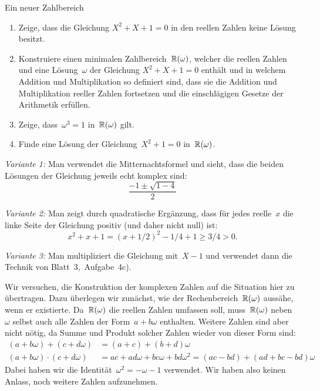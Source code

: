\documentclass{algblatt}
\begin{document}
\ifloesungen\newpage\fi
\begin{aufgabe}{Ein neuer Zahlbereich}
\begin{enumerate}
\item
Zeige, dass die Gleichung $X^2 + X + 1 = 0$ in den reellen Zahlen
keine Lösung besitzt.
\item
Konstruiere einen minimalen Zahlbereich~$\mathbb{R}(\omega)$, welcher die
reellen Zahlen und eine Lösung~$\omega$ der Gleichung $X^2 + X + 1 = 0$
enthält und in welchem Addition und Multiplikation so definiert sind, dass sie
die Addition und Multiplikation reeller Zahlen fortsetzen und die
einschlägigen Gesetze der Arithmetik erfüllen.
\item Zeige, dass~$\omega^3 = 1$ in~$\mathbb{R}(\omega)$ gilt.
\item Finde eine Lösung der Gleichung~$X^2 + 1 = 0$ in~$\mathbb{R}(\omega)$.
\end{enumerate}
\begin{loesungE}
\item \emph{Variante 1:} Man verwendet die Mitternachtsformel und sieht, dass
die beiden Lösungen der Gleichung jeweils echt komplex sind:
\[ \frac{-1 \pm \sqrt{1 - 4}}{2} \]

\emph{Variante 2:} Man zeigt durch quadratische Ergänzung, dass für jedes
reelle~$x$ die linke Seite der Gleichung positiv (und daher nicht null) ist:
\[ x^2 + x + 1 = (x + 1/2)^2 - 1/4 + 1 \geq 3/4 > 0. \]

\emph{Variante 3:} Man multipliziert die Gleichung mit~$X-1$ und verwendet dann
die Technik von Blatt~3,~Aufgabe~4c).

\item Wir versuchen, die Konstruktion der komplexen Zahlen auf die Situation
hier zu übertragen. Dazu überlegen wir zunächst, wie der
Rechenbereich~$\mathbb{R}(\omega)$ aussähe, wenn er existierte.
Da~$\mathbb{R}(\omega)$ die reellen Zahlen umfassen soll, muss~$\mathbb{R}(\omega)$
neben~$\omega$ selbst auch alle Zahlen der Form~$a + b\omega$ enthalten.
Weitere Zahlen sind aber nicht nötig, da Summe und Produkt solcher Zahlen
wieder von dieser Form sind:
\begin{align}
  \label{omegaadd}
  (a + b \omega) + (c + d \omega) &= (a+c) + (b+d) \omega \\
  \label{omegamult}
  (a + b \omega) \cdot (c + d \omega) &= ac + ad\omega + bc\omega + bd\omega^2 =
  (ac-bd) + (ad+bc-bd)\omega
\end{align}
Dabei haben wir die Identität~$\omega^2 = -\omega - 1$ verwendet. Wir haben
also keinen Anlass, noch weitere Zahlen aufzunehmen.


\end{loesungE}
\end{aufgabe}
\end{document}
